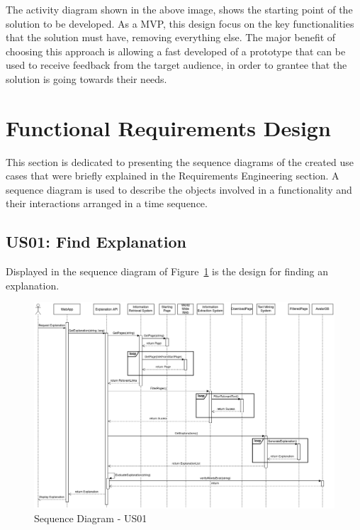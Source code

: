 The activity diagram shown in the above image, shows the starting point of the solution to be developed.
As a \gls{MVP}, this design focus on the key functionalities that the solution must have, removing everything else.
The major benefit of choosing this approach is allowing a fast developed of a prototype that can be used to receive feedback from the target audience, in order to grantee that the solution is going towards their needs.

\section{Functional Requirements Design}

This section is dedicated to presenting the sequence diagrams of the created use cases that were briefly explained in the Requirements Engineering section.
A sequence diagram is used to describe the objects involved in a functionality and their interactions arranged in a time sequence.

\subsection{US01: Find Explanation}

Displayed in the sequence diagram of Figure~\ref{fig:sdus01} is the design for finding an explanation.

\begin{figure}[H]
\centering
\includegraphics[width=\textwidth,keepaspectratio]{ch4/assets/US01_SD.png}
\caption[Sequence Diagram US01]{Sequence Diagram - US01}
\label{fig:sdus01}
\end{figure}

